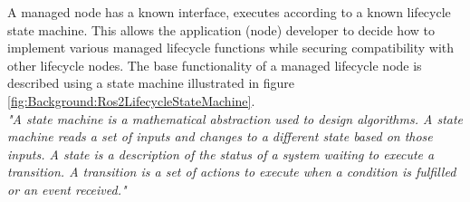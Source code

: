 	A managed node has a known interface, executes according to a known lifecycle state machine. This allows the application (node) developer to decide how to implement various managed lifecycle functions while securing compatibility with other lifecycle nodes.	
	The base functionality of a managed lifecycle node is described using a state machine illustrated in figure \ref{fig:Background:Ros2LifecycleStateMachine}.\\

	\textit{"A state machine is a mathematical abstraction used to design algorithms. A state machine reads a set of inputs and changes to a different state based on those inputs. A state is a description of the status of a system waiting to execute a transition. A transition is a set of actions to execute when a condition is fulfilled or an event received."} \cite*{statemachineDef}\\

